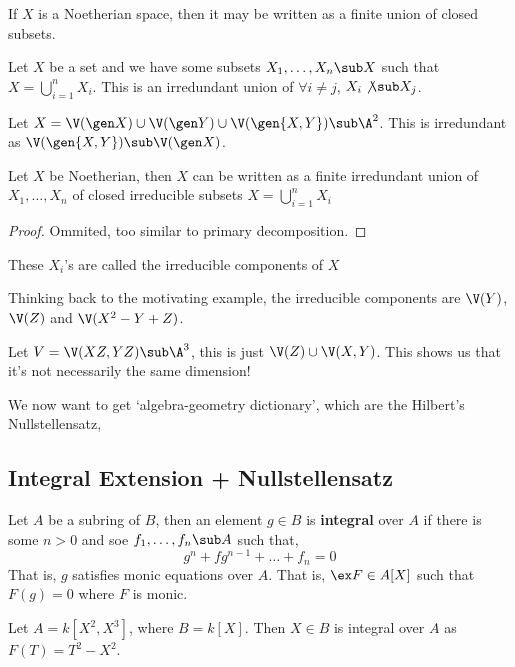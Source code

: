 \begin{remark}
   If $X$ is a Noetherian space, then it may be written as a finite union of closed subsets.
\end{remark}

\begin{ndefi}
  Let $X$ be a set and we have some subsets $X_1, \dots, X_n \sub X$ such that $X = \bigcup_{i=1}^n X_i$. This is an irredundant union of $\forall i \ne j$, $X_i \not\sub X_j$.
\end{ndefi}
\begin{eg}
  Let $X = \V(\gen X) \cup \V(\gen Y) \cup \V(\gen {X, Y}) \sub \A^2$. This is irredundant as $\V(\gen{X, Y}) \sub \V(\gen X)$.
\end{eg}


\begin{nthm}
  Let $X$ be Noetherian, then $X$ can be written as a finite irredundant union of $X_1, \dots, X_n$ of closed irreducible subsets $X = \bigcup_{i=1}^n X_i$
\end{nthm}
\begin{proof}
  Ommited, too similar to primary decomposition.
\end{proof}

\begin{ndefi}
  These $X_i$'s are called the irreducible components of $X$
\end{ndefi}
\begin{eg}
  Thinking back to the motivating example, the irreducible components are $\V(Y)$, $\V(Z)$ and $\V(X^2 - Y + Z)$.
\end{eg}
\begin{eg}
  Let $V = \V(XZ, YZ) \sub \A^3$, this is just $\V(Z) \cup \V(X, Y)$. This shows us that it's not necessarily the same dimension!
\end{eg}
\noindent
We now want to get `algebra-geometry dictionary', which are the Hilbert's Nullstellensatz,


\subsection{Integral Extension + Nullstellensatz}

\begin{ndefi}
  Let $A$ be a subring of $B$, then an element $g \in B$ is \textbf{integral} over $A$ if there is some $n > 0$ and soe $f_1, \dots, f_n \sub A$ such that,
  $$ g^n + fg^{n-1} + \dots + f_n = 0 $$
  That is, $g$ satisfies monic equations over $A$. That is, $\ex F \in A[X]$ such that $F(g) = 0$ where $F$ is monic.
\end{ndefi}

\begin{eg}
  Let $A = k[X^2, X^3]$, where $B = k[X]$. Then $X \in B$ is integral over $A$ as $F(T) = T^2 - X^2$.
\end{eg}
